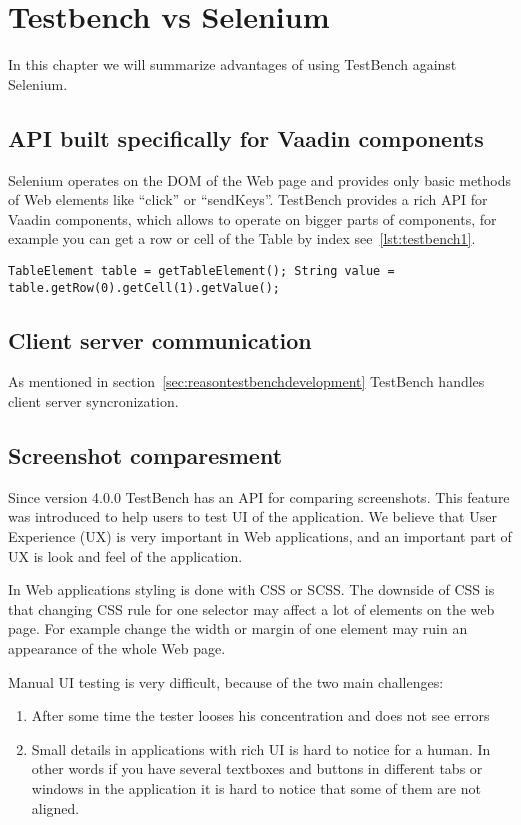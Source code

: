 \chapter{Testbench vs Selenium}
\label{ch:testbenchvsselenium}
In this chapter we will summarize advantages of using TestBench against
Selenium.

\section{API built specifically for Vaadin components}
Selenium operates on the DOM of the Web page and provides only basic methods of
Web elements like ``click'' or ``sendKeys''. TestBench provides a rich API for
Vaadin components, which allows to operate on bigger parts of components, for
 example you can get a row or cell of the Table by index
 see~\ref{lst:testbench1}.
  	\lstset{language=Java}
  	\begin{lstlisting}[caption=Get Vaadin Table cell Value,label={lst:testbench1}]
TableElement table = getTableElement(); String value = table.getRow(0).getCell(1).getValue();
	\end{lstlisting}
	
\section{Client server communication}
As mentioned in section~\ref{sec:reasontestbenchdevelopment} TestBench handles 
client server syncronization.

\section{Screenshot comparesment}
Since version 4.0.0 TestBench has an API for comparing screenshots. This 
feature was introduced to help users to test UI of the application. We believe
that User Experience (UX) is very important in Web applications, and an
important part of UX is look and feel of the application.

In Web applications styling is done with CSS or SCSS. The downside of CSS 
is that changing CSS rule for one selector may affect a lot of elements on the
web page. For example change the width or margin of one element may ruin an
appearance of the whole Web page.

Manual UI testing is very difficult, because of the two main challenges:
\begin{enumerate}
  \item After some time the tester looses his concentration and does not see
  errors
  \item Small details in applications with rich UI is hard to notice for a
  human. In other words if you have several textboxes and buttons in different
  tabs or windows in the application it is hard to notice that some of them are
  not aligned.
\end{enumerate}

